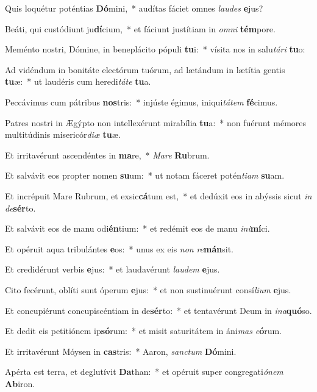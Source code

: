 \item Quis loquétur poténtias \textbf{Dó}mini,~* audítas fáciet omnes \textit{lau}\textit{des} \textbf{e}jus?
\item Beáti, qui custódiunt ju\textbf{dí}cium,~* et fáciunt justítiam in \textit{om}\textit{ni} \textbf{tém}pore.
\item Meménto nostri, Dómine, in beneplácito pópuli \textbf{tu}i:~* vísita nos in salu\textit{tá}\textit{ri} \textbf{tu}o:
\item Ad vidéndum in bonitáte electórum tuórum, ad lætándum in lætítia gentis \textbf{tu}æ:~* ut laudéris cum heredi\textit{tá}\textit{te} \textbf{tu}a.
\item Peccávimus cum pátribus \textbf{nos}tris:~* injúste égimus, iniqui\textit{tá}\textit{tem} \textbf{fé}cimus.
\item Patres nostri in Ægýpto non intellexérunt mirabília \textbf{tu}a:~* non fuérunt mémores multitúdinis misericór\textit{di}\textit{æ} \textbf{tu}æ.
\item Et irritavérunt ascendéntes in \textbf{ma}re,~* \textit{Ma}\textit{re} \textbf{Ru}brum.
\item Et salvávit eos propter nomen \textbf{su}um:~* ut notam fáceret potén\textit{ti}\textit{am} \textbf{su}am.
\item Et incrépuit Mare Rubrum, et exsic\textbf{cá}tum est,~* et dedúxit eos in abýssis sicut \textit{in} \textit{de}\textbf{sér}to.
\item Et salvávit eos de manu odi\textbf{én}tium:~* et redémit eos de manu \textit{in}\textit{i}\textbf{mí}ci.
\item Et opéruit aqua tribulántes \textbf{e}os:~* unus ex eis \textit{non} \textit{re}\textbf{mán}sit.
\item Et credidérunt verbis \textbf{e}jus:~* et laudavérunt \textit{lau}\textit{dem} \textbf{e}jus.
\item Cito fecérunt, oblíti sunt óperum \textbf{e}jus:~* et non sustinuérunt consí\textit{li}\textit{um} \textbf{e}jus.
\item Et concupiérunt concupiscéntiam in de\textbf{sér}to:~* et tentavérunt Deum in \textit{in}\textit{a}\textbf{quó}so.
\item Et dedit eis petitiónem ip\textbf{só}rum:~* et misit saturitátem in áni\textit{mas} \textit{e}\textbf{ó}rum.
\item Et irritavérunt Móysen in \textbf{cas}tris:~* Aaron, \textit{sanc}\textit{tum} \textbf{Dó}mini.
\item Apérta est terra, et deglutívit \textbf{Da}than:~* et opéruit super congregati\textit{ó}\textit{nem} \textbf{Ab}iron.
